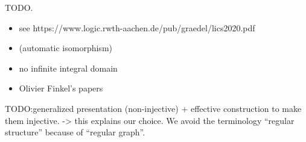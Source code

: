 TODO.
\begin{itemize}
	\item see https://www.logic.rwth-aachen.de/pub/graedel/lics2020.pdf
	\item \cite[\S~6]{KhoussainovNerode1995AutomaticPresentations} (automatic isomorphism)
	\item no infinite integral domain \cite{KhoussainovNiesRubinStephan2007Automatic}
	\item Olivier Finkel's papers
\end{itemize}

TODO:generalized presentation (non-injective) + effective construction to make them injective.
-> this explains our choice. We avoid the terminology ``regular structure'' because of
``regular graph''.
